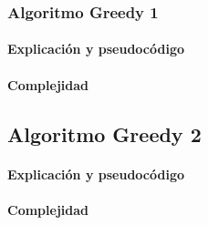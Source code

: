 \subsubsection{Algoritmo Greedy 1}

\paragraph{Explicación y pseudocódigo}

\paragraph{Complejidad}


\subsection{Algoritmo Greedy 2}

\paragraph{Explicación y pseudocódigo}

\paragraph{Complejidad}